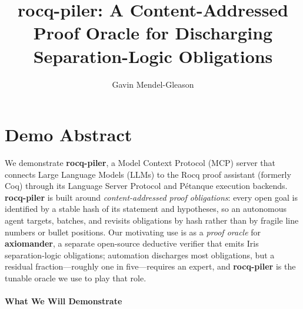 \documentclass[sigconf,screen]{acmart}
\begin{document}
\title{rocq-piler: A Content-Addressed Proof Oracle for Discharging Separation-Logic Obligations}

\author{Gavin Mendel-Gleason}

\maketitle

\section*{Demo Abstract}

We demonstrate \textbf{rocq-piler}, a Model Context Protocol (MCP) server that
connects Large Language Models (LLMs) to the Rocq proof assistant (formerly Coq)
through its Language Server Protocol and Pétanque execution backends. \textbf{rocq-piler}
is built around \emph{content-addressed proof obligations}: every open goal is
identified by a stable hash of its statement and hypotheses, so an autonomous
agent targets, batches, and revisits obligations by hash rather than by fragile
line numbers or bullet positions. Our motivating use is as a \emph{proof oracle}
for \textbf{axiomander}, a separate open-source deductive verifier that emits
Iris separation-logic obligations; automation discharges most obligations, but a
residual fraction---roughly one in five---requires an expert, and \textbf{rocq-piler}
is the tunable oracle we use to play that role.

\paragraph{What We Will Demonstrate}
\end{document}
